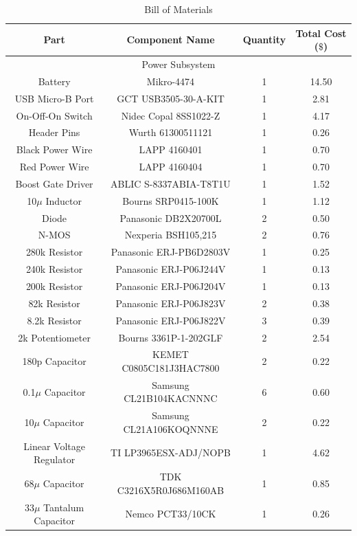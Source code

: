 \documentclass[12pt]{article}
\begin{document}
\begin{table}[!h]
	\caption{Bill of Materials}
	\label{tab:block_comps}
	\centering
	{\small
	\begin{tabular}{ |c|c|c|c| } 
 		\hline
 		\textbf{Part} & \textbf{Component Name} & \textbf{Quantity} & \textbf{Total Cost} ($\$$) \\
 		\hline
 		\hline
 		\multicolumn{4}{|c|}{Power Subsystem} \\
 		\hline
 		Battery & Mikro-4474 & 1 & 14.50 \\
 		USB Micro-B Port & GCT USB3505-30-A-KIT & 1 & 2.81 \\
 		On-Off-On Switch & Nidec Copal 8SS1022-Z & 1 & 4.17 \\
 		Header Pins & Wurth 61300511121 & 1 & 0.26 \\
 		Black Power Wire & LAPP 4160401 & 1 & 0.70 \\
 		Red Power Wire & LAPP 4160404 & 1 & 0.70 \\
 		Boost Gate Driver & ABLIC S-8337ABIA-T8T1U & 1 & 1.52 \\
 		10$\mu$ Inductor & Bourns SRP0415-100K & 1 & 1.12 \\
 		Diode & Panasonic DB2X20700L & 2 & 0.50 \\
 		N-MOS & Nexperia BSH105,215 & 2 & 0.76 \\
 		280k Resistor & Panasonic ERJ-PB6D2803V & 1 & 0.25 \\
 		240k Resistor & Panasonic ERJ-P06J244V & 1 & 0.13 \\
 		200k Resistor & Panasonic ERJ-P06J204V & 1 & 0.13 \\
 		82k Resistor & Panasonic ERJ-P06J823V & 2 & 0.38 \\
 		8.2k Resistor & Panasonic ERJ-P06J822V & 3 & 0.39 \\
 		2k Potentiometer & Bourns 3361P-1-202GLF & 2 & 2.54 \\
 		180p Capacitor & KEMET C0805C181J3HAC7800 & 2 & 0.22 \\
 		0.1$\mu$ Capacitor & Samsung CL21B104KACNNNC & 6 & 0.60 \\
 		10$\mu$ Capacitor & Samsung CL21A106KOQNNNE & 2 & 0.22 \\
 		Linear Voltage Regulator & TI LP3965ESX-ADJ/NOPB & 1 & 4.62 \\
 		68$\mu$ Capacitor & TDK C3216X5R0J686M160AB & 1 & 0.85 \\
 		33$\mu$ Tantalum Capacitor & Nemco PCT33/10CK & 1 & 0.26 \\

\end{tabular}}
\end{table}
\end{document}

